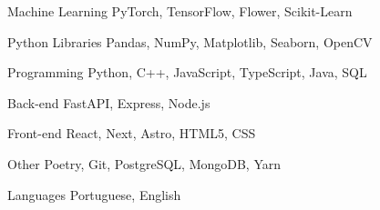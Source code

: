 

\begin{cvskills}

  \cvskill
    {Machine Learning} %
    {PyTorch, TensorFlow, Flower, Scikit-Learn} %

  \cvskill
  {Python Libraries} %
  {Pandas, NumPy, Matplotlib, Seaborn, OpenCV} %

  \cvskill
    {Programming} %
    {Python, C++, JavaScript, TypeScript, Java, SQL} %
    


  \cvskill
    {Back-end} %
    {FastAPI, Express, Node.js} %

  \cvskill
    {Front-end} %
    {React, Next, Astro, HTML5, CSS} %

  \cvskill
  {Other} %
  {Poetry, Git, PostgreSQL, MongoDB, Yarn} %

  \cvskill
    {Languages} %
    {Portuguese, English} %

\end{cvskills}
